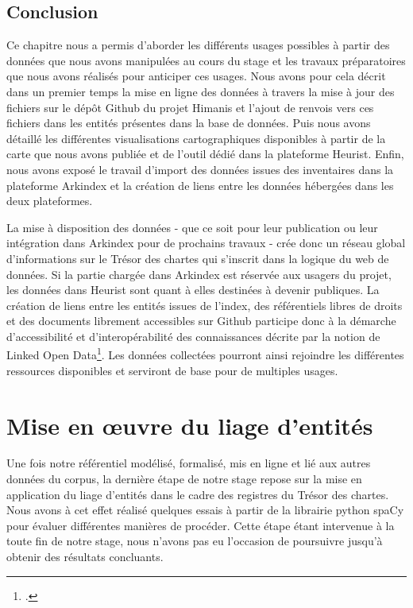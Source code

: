\documentclass[a4paper,12pt,twoside]{book}
\begin{document}
	\section*{Conclusion}
	
	Ce chapitre nous a permis d'aborder les différents usages possibles à partir des données que nous avons manipulées au cours du stage et les travaux préparatoires que nous avons réalisés pour anticiper ces usages. Nous avons pour cela décrit dans un premier temps la mise en ligne des données à travers la mise à jour des fichiers sur le dépôt Github du projet Himanis et l'ajout de renvois vers ces fichiers dans les entités présentes dans la base de données. Puis nous avons détaillé les différentes visualisations cartographiques disponibles à partir de la carte que nous avons publiée et de l'outil dédié dans la plateforme Heurist. Enfin, nous avons exposé le travail d'import des données issues des inventaires dans la plateforme Arkindex et la création de liens entre les données hébergées dans les deux plateformes.
	
	La mise à disposition des données - que ce soit pour leur publication ou leur intégration dans Arkindex pour de prochains travaux - crée donc un réseau global d'informations sur le Trésor des chartes qui s'inscrit dans la logique du web de données. Si la partie chargée dans Arkindex est réservée aux usagers du projet, les données dans Heurist sont quant à elles destinées à devenir publiques. La création de liens entre les entités issues de l'index, des référentiels libres de droits et des documents librement accessibles sur Github participe donc à la démarche d'accessibilité et d'interopérabilité des connaissances décrite par la notion de Linked Open Data\footcite{hugi_vous_2013}. Les données collectées pourront ainsi rejoindre les différentes ressources disponibles et serviront de base pour de multiples usages.
	
	\chapter{Mise en œuvre du liage d'entités}
	
	Une fois notre référentiel modélisé, formalisé, mis en ligne et lié aux autres données du corpus, la dernière étape de notre stage repose sur la mise en application du liage d'entités dans le cadre des registres du Trésor des chartes. Nous avons à cet effet réalisé quelques essais à partir de la librairie python spaCy pour évaluer différentes manières de procéder. Cette étape étant intervenue à la toute fin de notre stage, nous n'avons pas eu l'occasion de poursuivre jusqu'à obtenir des résultats concluants.
	
\end{document}
